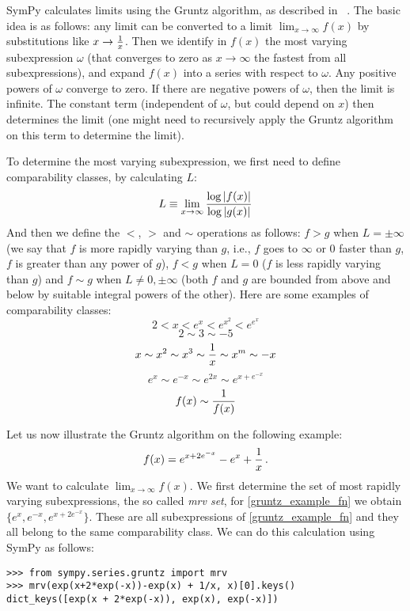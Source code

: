 SymPy calculates limits using the Gruntz algorithm, as described in%
~\cite{Gruntz1996limits}. The basic idea is as follows: any limit can be
converted to a limit $\lim_{x\to\infty} f(x)$ by substitutions like
$x\to{1\over x}$.
Then we identify in $f(x)$ the most varying subexpression $\omega$ (that
converges to zero as $x\to\infty$ the fastest from all subexpressions), and
expand $f(x)$ into a series with respect to $\omega$. Any positive powers of
$\omega$ converge to zero. If there are negative powers of $\omega$, then the
limit is infinite. The constant term (independent of $\omega$, but could depend
on $x$) then determines the limit (one might need to recursively apply the
Gruntz algorithm on this term to determine the limit).

To determine the most varying subexpression, we first need to define
comparability classes, by calculating $L$:
\begin{equation}
L\equiv \lim_{x\to\infty} {\log |f(x)| \over \log |g(x)|}
\end{equation}
And then we define the $<$, $>$ and $\sim$ operations as follows: $f>g$ when
$L=\pm\infty$ (we say that $f$ is more rapidly varying than $g$, i.e., $f$ goes
to $\infty$ or $0$ faster than $g$, $f$ is greater than any power of $g$),
$f<g$ when $L=0$ ($f$ is less rapidly varying than $g$) and $f\sim g$ when
$L\neq 0,\pm\infty$ (both $f$ and $g$ are bounded from above and below by
suitable integral powers of the other). Here are some examples of comparability
classes:
$$2 < x < e^x < e^{x^2} < e^{e^x}$$
$$2\sim 3\sim -5$$
$$x\sim x^2\sim x^3\sim {1\over x}\sim x^m\sim -x$$
$$e^x\sim e^{-x}\sim e^{2x}\sim e^{x+e^{-x}}$$
$$f(x)\sim{1\over f(x)}$$

Let us now illustrate the Gruntz algorithm on the following example:
\begin{equation}
    \label{gruntz_example_fn}
f(x) = e^{x+2e^{-x}} - e^x + {1\over x} \,.
\end{equation}
We want to calculate $\lim_{x\to\infty} f(x)$.
We first determine the set of most rapidly varying subexpressions, the so
called \textit{mrv set}, for \eqref{gruntz_example_fn} we obtain
$\{e^x, e^{-x}, e^{x+2e^{-x}}\}$. These are all subexpressions of
\eqref{gruntz_example_fn} and they all belong to the same comparability class.
We can do this calculation using SymPy as follows:

\begin{verbatim}
>>> from sympy.series.gruntz import mrv
>>> mrv(exp(x+2*exp(-x))-exp(x) + 1/x, x)[0].keys()
dict_keys([exp(x + 2*exp(-x)), exp(x), exp(-x)])
\end{verbatim}



